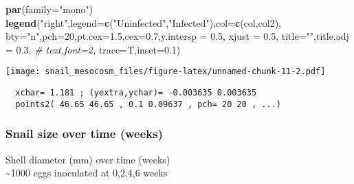 \documentclass[10,portrait]{article}
\newenvironment{Shaded}{\begin{snugshade}}{\end{snugshade}}
\newcommand{\KeywordTok}[1]{\textcolor[rgb]{0.13,0.29,0.53}{\textbf{#1}}}
\newcommand{\DataTypeTok}[1]{\textcolor[rgb]{0.13,0.29,0.53}{#1}}
\newcommand{\DecValTok}[1]{\textcolor[rgb]{0.00,0.00,0.81}{#1}}
\newcommand{\FloatTok}[1]{\textcolor[rgb]{0.00,0.00,0.81}{#1}}
\newcommand{\StringTok}[1]{\textcolor[rgb]{0.31,0.60,0.02}{#1}}
\newcommand{\CommentTok}[1]{\textcolor[rgb]{0.56,0.35,0.01}{\textit{#1}}}
\newcommand{\NormalTok}[1]{#1}
\begin{document}
\begin{Shaded}
\begin{Highlighting}[]
\KeywordTok{par}\NormalTok{(}\DataTypeTok{family=}\StringTok{"mono"}\NormalTok{)}
\KeywordTok{legend}\NormalTok{(}\StringTok{"right"}\NormalTok{,}\DataTypeTok{legend=}\KeywordTok{c}\NormalTok{(}\StringTok{"Uninfected"}\NormalTok{,}\StringTok{"Infected"}\NormalTok{),}\DataTypeTok{col=}\KeywordTok{c}\NormalTok{(col,col2),}
       \DataTypeTok{bty=}\StringTok{"n"}\NormalTok{,}\DataTypeTok{pch=}\DecValTok{20}\NormalTok{,}\DataTypeTok{pt.cex=}\FloatTok{1.5}\NormalTok{,}\DataTypeTok{cex=}\FloatTok{0.7}\NormalTok{,}\DataTypeTok{y.intersp =} \FloatTok{0.5}\NormalTok{, }\DataTypeTok{xjust =} \FloatTok{0.5}\NormalTok{,}
       \DataTypeTok{title=}\StringTok{""}\NormalTok{,}\DataTypeTok{title.adj =} \FloatTok{0.3}\NormalTok{,}
       \CommentTok{# text.font=2,}
       \DataTypeTok{trace=}\NormalTok{T,}\DataTypeTok{inset=}\FloatTok{0.1}\NormalTok{)}
\end{Highlighting}
\end{Shaded}

\texttt{[image: snail\_mesocosm\_files/figure-latex/unnamed-chunk-11-2.pdf]}

\begin{verbatim}
  xchar= 1.181 ; (yextra,ychar)= -0.003635 0.003635 
  points2( 46.65 46.65 , 0.1 0.09637 , pch= 20 20 , ...) 
\end{verbatim}

\subsubsection{Snail size over time
(weeks)}\label{snail-size-over-time-weeks}

Shell diameter (mm) over time (weeks)\\
\textasciitilde{}1000 eggs inoculated at 0,2,4,6 weeks
\end{document}
